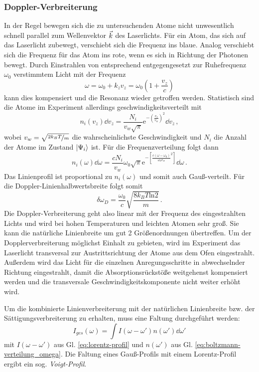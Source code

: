 \subsubsection{Doppler-Verbreiterung}\label{subsubsec:doppler-verbreiterung}
In der Regel bewegen sich die zu untersuchenden Atome nicht unwesentlich schnell
parallel zum Wellenvektor $\vec{k}$ des Laserlichts. Für ein Atom, das sich auf das
Laserlicht zubewegt, verschiebt sich die Frequenz ins blaue. Analog verschiebt
sich die Frequenz für das Atom ins rote, wenn es sich in Richtung der
Photonen bewegt. Durch Einstrahlen von entsprechend entgegengesetzt zur
Ruhefrequenz $\omega_0$ verstimmtem Licht mit der Frequenz
\begin{equation}\label{eq:doppler}
	\omega=\omega_0+k_zv_z=\omega_0\left(1+\frac{v_z}{c}\right)
\end{equation}
kann dies kompensiert und die Resonanz wieder getroffen werden. Statistisch sind
die Atome im Experiment allerdings geschwindigkeitsverteilt
\cite{demtroeder:laserspektroskopie} mit
\begin{equation}\label{eq:boltzmann-verteilung_v}
	n_i(v_z)\dd{v_z}=\frac{N_i}{v_w\sqrt{\pi}}\mathrm{e}^{-\left(\frac{v_z}{v_w}\right)^2}\dd{v_z}\,,
\end{equation}
wobei $v_w=\sqrt{\nicefrac{2k_BT}{m}}$ die wahrscheinlichste Geschwindigkeit und
$N_i$ die Anzahl der Atome im Zustand $|{\Psi_i}\rangle$ ist. Für die
Frequenzverteilung folgt dann
\begin{equation}\label{eq:boltzmann-verteilung_omega}
	n_i(\omega)\dd\omega=\frac{cN_i}{v_w}\omega_0\sqrt{\pi}\mathrm{e}^{-\left[\frac{c(\omega-\omega_0)}{\omega_0v_w}^2\right]}\dd\omega\,.
\end{equation}
Das Linienprofil ist proportional zu $n_i(\omega)$ und somit auch Gauß-verteilt.
Für die Doppler-Linienhalbwertsbreite folgt somit  
\begin{equation}\label{eq:doppler-breite}
	\delta\omega_D=\frac{\omega_0}{c}\sqrt{\frac{8k_BT\mathrm{ln}2}{m}}\,.
\end{equation}
Die Doppler-Verbreiterung geht also linear mit der Frequenz des eingestrahlten
Lichts und wird bei hohen Temperaturen und leichten Atomen sehr groß. Sie kann
die natürliche Linienbreite um gut 2 Größenordnungen übertreffen. Um der
Dopplerverbreiterung möglichst Einhalt zu gebieten, wird im Experiment das
Laserlicht transversal zur Austrittsrichtung der Atome aus dem Ofen
eingestrahlt. Außerdem wird das Licht für die einzelnen Anregungsschritte in
abwechselnder Richtung eingestrahlt, damit die Absorptionsrückstöße weitgehenst
kompensiert werden und die transversale Geschwindigkeitskomponente nicht weiter
erhöht wird.\par
Um die kombinierte Linienverbreiterung mit der natürlichen Linienbreite bzw. der
Sättigungsverbreiterung zu erhalten, muss eine Faltung durchgeführt werden:
\begin{equation}\label{eq:voigt_doppler}
	I_{ges}(\omega)=\int{I(\omega-\omega')n(\omega')\dd\omega'}
\end{equation}
mit $I(\omega-\omega')$ aus Gl. \eqref{eq:lorentz-profil} und $n(\omega')$ aus
Gl. \eqref{eq:boltzmann-verteilung_omega}. Die Faltung eines Gauß-Profils mit
einem Lorentz-Profil ergibt ein sog. \textit{Voigt-Profil}.

